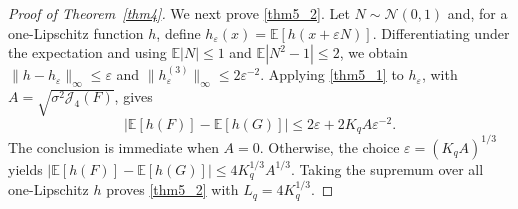 \documentclass[10pt,a4paper]{amsart}
\newcommand{\E}{\mathbb{E}}
\newcommand{\Jfour}{\mathcal J_4}
\newcommand{\NN}{\mathcal{N}}
\newcommand{\eps}{\varepsilon}
\begin{document}
\begin{proof}[Proof of Theorem~\ref{thm4}]
\medskip

We next prove \eqref{thm5_2}.  Let $N\sim\NN(0,1)$ and, for a
one-Lipschitz function $h$, define
$h_\eps(x)=\E[h(x+\eps N)]$.  Differentiating under the expectation
and using $\E|N|\leq1$ and $\E|N^2-1|\leq2$, we obtain
$\|h-h_\eps\|_\infty\leq\eps$ and
$\|h_\eps^{(3)}\|_\infty\leq2\eps^{-2}$.  Applying
\eqref{thm5_1} to $h_\eps$, with
$A=\sqrt{\sigma^2\Jfour(F)}$, gives
\[
 |\E[h(F)]-\E[h(G)]|
 \leq2\eps+2K_qA\eps^{-2}.
\]
The conclusion is immediate when $A=0$.  Otherwise, the choice
$\eps=(K_qA)^{1/3}$ yields
$|\E[h(F)]-\E[h(G)]|\leq4K_q^{1/3}A^{1/3}$.  Taking the supremum
over all one-Lipschitz $h$ proves \eqref{thm5_2} with
$L_q=4K_q^{1/3}$.
\qedhere

\end{proof}
\end{document}
